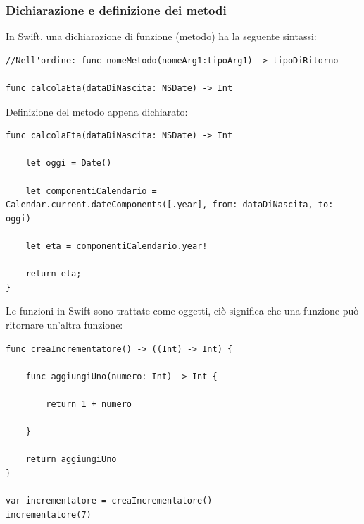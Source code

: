 \subsubsection{Dichiarazione e definizione dei metodi}
In Swift, una dichiarazione di funzione (metodo) ha la seguente sintassi: 
\lstset{language=[Objective]C, breakindent=40pt, breaklines}
\begin{lstlisting}
//Nell'ordine: func nomeMetodo(nomeArg1:tipoArg1) -> tipoDiRitorno

func calcolaEta(dataDiNascita: NSDate) -> Int

\end{lstlisting}
Definizione del metodo appena dichiarato: 
\lstset{language=[Objective]C, breakindent=40pt, breaklines}
\begin{lstlisting}
func calcolaEta(dataDiNascita: NSDate) -> Int

	let oggi = Date()
      
    let componentiCalendario = Calendar.current.dateComponents([.year], from: dataDiNascita, to: oggi)                             			
	
	let eta = componentiCalendario.year!
	
	return eta;
}
\end{lstlisting}
Le funzioni in Swift sono trattate come oggetti, ciò significa che una funzione può ritornare un'altra funzione: 
\lstset{language=[Objective]C, breakindent=40pt, breaklines}
\begin{lstlisting}
func creaIncrementatore() -> ((Int) -> Int) {
	
	func aggiungiUno(numero: Int) -> Int {
	
		return 1 + numero 
	
	}
	
	return aggiungiUno
}

var incrementatore = creaIncrementatore()
incrementatore(7)
\end{lstlisting}
